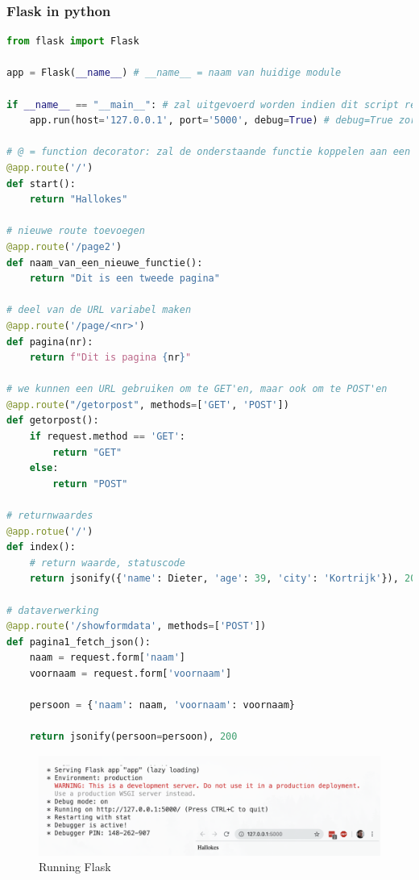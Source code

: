 \documentclass{article}
\begin{document}
\subsubsection{Flask in python}
\begin{lstlisting}[language=python]
from flask import Flask

app = Flask(__name__) # __name__ = naam van huidige module

if __name__ == "__main__": # zal uitgevoerd worden indien dit script rechtstreeks uitgevoerd wordt (dus niet via een import vanuit een andere file)
    app.run(host='127.0.0.1', port='5000', debug=True) # debug=True zorgt ervoor dat de server opnieuw wordt gestart bij wijziging van je code.

# @ = function decorator: zal de onderstaande functie koppelen aan een pad en een method. Je kan dit vergelijken met een form method en action, standaard method is hier GET
@app.route('/')
def start():
    return "Hallokes"

# nieuwe route toevoegen
@app.route('/page2')
def naam_van_een_nieuwe_functie():
    return "Dit is een tweede pagina"

# deel van de URL variabel maken
@app.route('/page/<nr>')
def pagina(nr):
    return f"Dit is pagina {nr}"

# we kunnen een URL gebruiken om te GET'en, maar ook om te POST'en
@app.route("/getorpost", methods=['GET', 'POST'])
def getorpost():
    if request.method == 'GET':
        return "GET"
    else:
        return "POST"

# returnwaardes
@app.rotue('/')
def index():
    # return waarde, statuscode
    return jsonify({'name': Dieter, 'age': 39, 'city': 'Kortrijk'}), 200

# dataverwerking
@app.route('/showformdata', methods=['POST'])
def pagina1_fetch_json():
    naam = request.form['naam']
    voornaam = request.form['voornaam']

    persoon = {'naam': naam, 'voornaam': voornaam}

    return jsonify(persoon=persoon), 200

\end{lstlisting}

\begin{figure}[H]
    \centering
    \includegraphics[width=\textwidth]{img/Screenshot_20200302_110759.png}
    \caption{Running Flask}
\end{figure}
\end{document}
